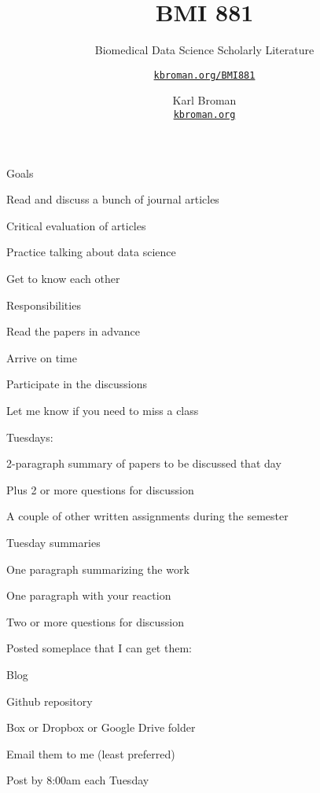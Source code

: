 \documentclass[aspectratio=169,12pt,t]{beamer}
\title{BMI 881}
\subtitle{Biomedical Data Science Scholarly Literature}
\author{\href{https://kbroman.org/BMI881}{\tt kbroman.org/BMI881} }
\institute{}
\date{\small \hspace{3in} Karl Broman \\
  \hspace{3in} \href{https://kbroman.org}{\color{foreground}
    \small \tt kbroman.org}}
\begin{document}
{
\frame{
  \titlepage
} }




\begin{frame}{Goals}

  \bbi
\item Read and discuss a bunch of journal articles
\item Critical evaluation of articles
\item Practice talking about data science
\item Get to know each other
  \ei

\end{frame}














\begin{frame}{Responsibilities}

  \bbi
\item Read the papers in advance
\item Arrive on time
\item Participate in the discussions
\item Let me know if you need to miss a class
\item Tuesdays:
  \bi
  \item 2-paragraph summary of papers to be discussed that day
  \item Plus 2 or more questions for discussion
  \ei
\item A couple of other written assignments during the semester
  \ei

\end{frame}



\begin{frame}{Tuesday summaries}

  \bbi
\item One paragraph summarizing the work
\item One paragraph with your reaction
\item Two or more questions for discussion
\item Posted someplace that I can get them:
  \bi
\item Blog
\item Github repository
\item Box or Dropbox or Google Drive folder
\item Email them to me (least preferred)
  \ei
\item Post by 8:00am each Tuesday
\ei

\end{frame}
\end{document}
